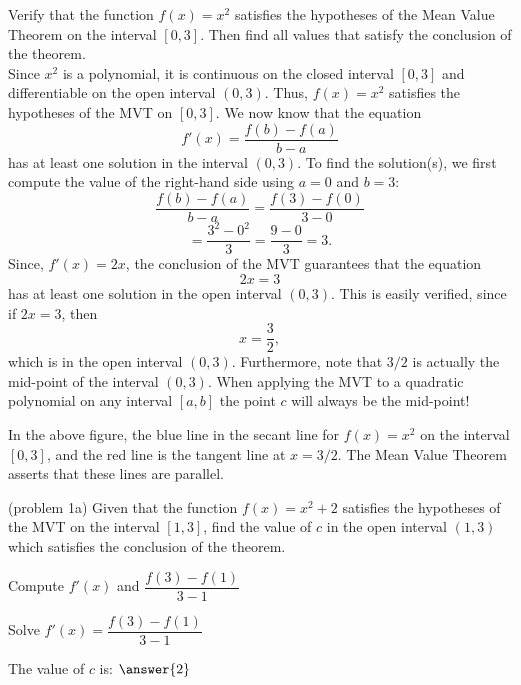 \documentclass[handout]{ximera}
\begin{document}
\begin{example}[example 1]
Verify that the function $f(x) = x^2$ satisfies the hypotheses of the Mean Value Theorem
on the interval $[0,3]$. Then find all values that satisfy the conclusion of the theorem.\\
Since $x^2$ is a polynomial, it is continuous on the closed interval $[0, 3]$ and differentiable on the open interval $(0, 3)$. 
Thus, $f(x) = x^2$ satisfies the hypotheses of the MVT on $[0, 3]$. We now know that the equation
\[
f'(x) = \frac{f(b) - f(a)}{b-a}
\]
has at least one solution in the interval $(0, 3)$. To find the solution(s), 
we first compute the value of the right-hand side using $a = 0$ and $b = 3$:
\[\frac{f(b) - f(a)}{b-a} = \frac{f(3) - f(0)}{3-0} \]
\[= \frac{3^2 - 0^2}{3}= \frac{9 - 0}{3} = 3.\]
Since, $f'(x) = 2x$,
the conclusion of the MVT guarantees that the equation
\[2x = 3\]
has at least one solution in the open interval $(0,3)$.
This is easily verified, since if $2x = 3$, then 
\[x = \frac{3}{2},
\]
which is in the open interval $(0, 3)$.
Furthermore, note that $3/2$ is actually the mid-point of the interval $(0, 3)$.
When applying the MVT to a quadratic polynomial on any interval $[a, b]$ the point $c$ will always be the mid-point!


\begin{image}
\end{image}

In the above figure, the blue line in the secant line for $f(x) = x^2$ on the interval $[0, 3]$, 
and the red line is the tangent line at $x = 3/2$. The Mean Value Theorem asserts that these lines are parallel.
\end{example}

\begin{problem}(problem 1a)
  Given that the function $f(x) = x^2 + 2$ satisfies the hypotheses of the MVT on the
	interval $[1,3]$, find the value of $c$ in the open interval $(1,3)$ which satisfies 
	the conclusion of the theorem.
	
    \begin{hint}
      Compute $f'(x)$ and $\dfrac{f(3) - f(1)}{3-1}$
    \end{hint}
		\begin{hint}
		  Solve $f'(x) = \dfrac{f(3) - f(1)}{3-1}$
		\end{hint}
		
		The value of $c$ is:
		 $\answer{2}$
\end{problem}
\end{document}
